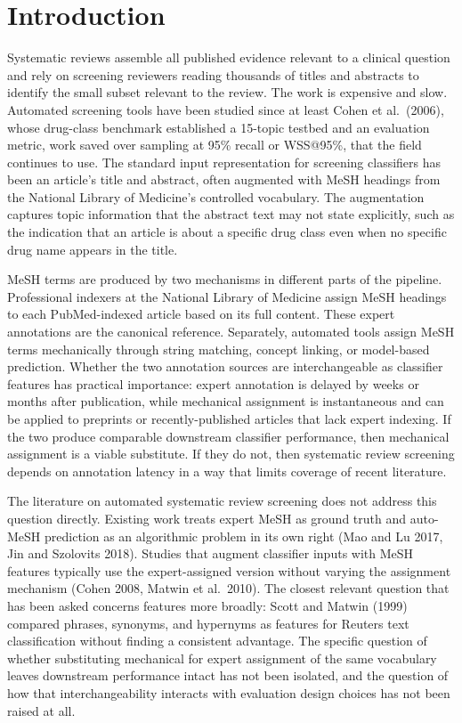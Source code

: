 \documentclass[11pt,a4paper]{article}
\begin{document}
\section{Introduction}

Systematic reviews assemble all published evidence relevant to a clinical question and rely on screening reviewers reading thousands of titles and abstracts to identify the small subset relevant to the review. The work is expensive and slow. Automated screening tools have been studied since at least Cohen et al.\ (2006), whose drug-class benchmark established a 15-topic testbed and an evaluation metric, work saved over sampling at 95\% recall or WSS@95\%, that the field continues to use. The standard input representation for screening classifiers has been an article's title and abstract, often augmented with MeSH headings from the National Library of Medicine's controlled vocabulary. The augmentation captures topic information that the abstract text may not state explicitly, such as the indication that an article is about a specific drug class even when no specific drug name appears in the title.

MeSH terms are produced by two mechanisms in different parts of the pipeline. Professional indexers at the National Library of Medicine assign MeSH headings to each PubMed-indexed article based on its full content. These expert annotations are the canonical reference. Separately, automated tools assign MeSH terms mechanically through string matching, concept linking, or model-based prediction. Whether the two annotation sources are interchangeable as classifier features has practical importance: expert annotation is delayed by weeks or months after publication, while mechanical assignment is instantaneous and can be applied to preprints or recently-published articles that lack expert indexing. If the two produce comparable downstream classifier performance, then mechanical assignment is a viable substitute. If they do not, then systematic review screening depends on annotation latency in a way that limits coverage of recent literature.

The literature on automated systematic review screening does not address this question directly. Existing work treats expert MeSH as ground truth and auto-MeSH prediction as an algorithmic problem in its own right (Mao and Lu 2017, Jin and Szolovits 2018). Studies that augment classifier inputs with MeSH features typically use the expert-assigned version without varying the assignment mechanism (Cohen 2008, Matwin et al.\ 2010). The closest relevant question that has been asked concerns features more broadly: Scott and Matwin (1999) compared phrases, synonyms, and hypernyms as features for Reuters text classification without finding a consistent advantage. The specific question of whether substituting mechanical for expert assignment of the same vocabulary leaves downstream performance intact has not been isolated, and the question of how that interchangeability interacts with evaluation design choices has not been raised at all.
\end{document}
